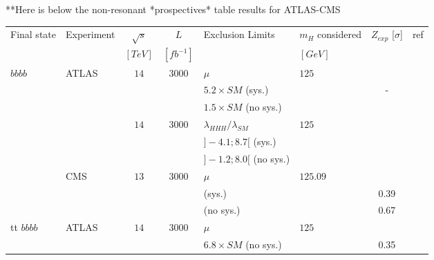 **Here is below the non-resonant *prospectives* table results for ATLAS-CMS

\begin{table}[h!]
\footnotesize
\begin{center}
\begin{tabular}{|l|l|c|c|l|l|c|c|}
\hline
Final state            &Experiment        &$\sqrt{s}$    &$L$        &Exclusion Limits    &$m_H$ considered &$Z_{exp}$ [$\sigma$]    &ref\\
\multicolumn{1}{|c|}{}        &            &$[TeV]$    &$[fb^{-1}]$    &            &$[GeV]$          &    &\\
\hline
$bb bb$                &ATLAS            &$14$        &$3000$        &$\mu$                &$125$        &    &\cite{prospects_HL_LHC_HH_bb_bb}\\
                &            &        &        &$5.2\times SM$ (sys.)        &        &-    &\\
                &            &        &        &$1.5\times SM$ (no sys.)    &        &    &\\
\cline{5-8}
\cline{3-8}
                &            &$14$        &$3000$        &$\lambda_{HHH}/\lambda_{SM}$    &$125$        &    &\cite{Collaboration:2285585}\\
                &            &        &        &$]-4.1 ; 8.7[$ (sys.)        &        &    &\\
                &            &        &        &$]-1.2 ; 8.0[$ (no sys.)    &        &    &\\

\cline{2-8}
                &CMS            &$13$        &$3000$        &$\mu$                &$125.09$    &    &\cite{CMS:2017cwx}\\
                &            &        &        &(sys.)                &        &0.39    &\\
                &            &        &        &(no sys.)            &        &0.67    &\\
\cline{2-8}
tt $bb bb$            &ATLAS            &$14$        &$3000$        &$\mu$                &$125$        &    &\cite{prospects_HL_LHC_tt_HH_bb_bb}\\
                &            &        &        &$6.8\times SM$ (no sys.)    &        &0.35    &\\


\end{tabular}
\end{center}
\end{table}
